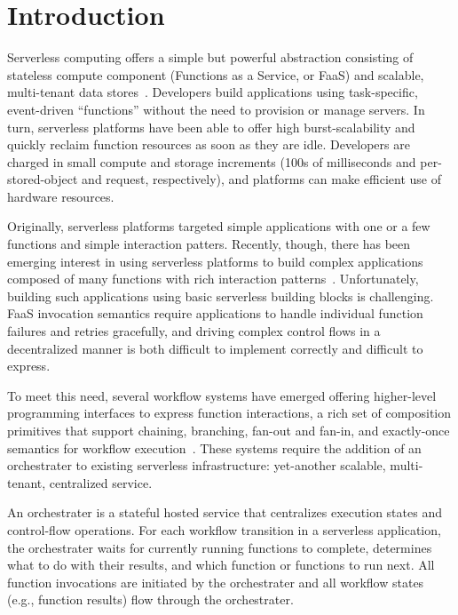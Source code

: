\section{Introduction}

Serverless computing offers a simple but powerful abstraction consisting of
stateless compute component (Functions as a Service, or FaaS) and scalable,
multi-tenant data stores~\cite{berkeley}. Developers build applications using
task-specific, event-driven ``functions'' without the need to provision or
manage servers. In turn, serverless platforms have been able to offer high
burst-scalability and quickly reclaim function resources as soon as they are
idle. Developers are charged in small compute and storage increments (100s of
milliseconds and per-stored-object and request, respectively), and platforms
can make efficient use of hardware resources.

Originally, serverless platforms targeted simple applications with one or a few
functions and simple interaction patters. Recently, though, there has been
emerging interest in using serverless platforms to build complex applications
composed of many functions with rich interaction patterns~\cite{excamera,
pywren, gg-atc, beldi, boki}. Unfortunately, building such applications using
basic serverless building blocks is challenging. FaaS invocation semantics
require applications to handle individual function failures and retries
gracefully, and driving complex control flows in a decentralized manner is both
difficult to implement correctly and difficult to express.

To meet this need, several workflow systems have emerged offering higher-level
programming interfaces to express function interactions, a rich set of
composition primitives that support chaining, branching, fan-out and fan-in, and
exactly-once semantics for workflow execution~\cite{excamera, gg-atc,
aws-step-functions, google-cloud-composer, google-workflows, durable-functions}.
These systems require the addition of an orchestrater to existing serverless
infrastructure: yet-another scalable, multi-tenant, centralized service.

An orchestrater is a stateful hosted service that centralizes execution states
and control-flow operations. For each workflow transition in a serverless
application, the orchestrater waits for currently running functions to complete,
determines what to do with their results, and which function or functions to run
next. All function invocations are initiated by the orchestrater and all
workflow states (e.g., function results) flow through the orchestrater.

